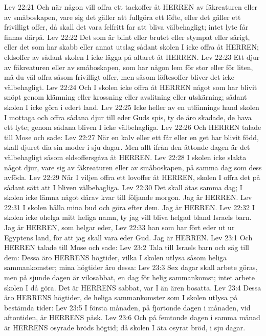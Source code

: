 Lev 22:21  Och när någon vill offra ett tackoffer åt HERREN av fäkreaturen eller av småboskapen, vare sig det gäller att fullgöra ett löfte, eller det gäller ett frivilligt offer, då skall det vara felfritt far att bliva välbehagligt; intet lyte får finnas därpå.
Lev 22:22  Det som är blint eller brutet eller stympat eller sårigt, eller det som har skabb eller annat utslag sådant skolen I icke offra åt HERREN; eldsoffer av sådant skolen I icke lägga på altaret åt HERREN.
Lev 22:23  Ett djur av fäkreaturen eller av småboskapen, som har någon lem för stor eller för liten, må du väl offra såsom frivilligt offer, men såsom löftesoffer bliver det icke välbehagligt.
Lev 22:24  Och I skolen icke offra åt HERREN något som har blivit snöpt genom klämning eller krossning eller avslitning eller utskärning; sådant skolen I icke göra i edert land.
Lev 22:25  Icke heller av en utlännings hand skolen I mottaga och offra sådana djur till eder Guds spis, ty de äro skadade, de hava ett lyte; genom sådana bliven I icke välbehagliga.
Lev 22:26  Och HERREN talade till Mose och sade:
Lev 22:27  När en kalv eller ett får eller en get har blivit född, skall djuret dia sin moder i sju dagar. Men allt ifrån den åttonde dagen är det välbehagligt såsom eldsoffersgåva åt HERREN.
Lev 22:28  I skolen icke slakta något djur, vare sig av fäkreaturen eller av småboskapen, på samma dag som dess avföda.
Lev 22:29  När I viljen offra ett lovoffer åt HERREN, skolen I offra det på sådant sätt att I bliven välbehagliga.
Lev 22:30  Det skall ätas samma dag; I skolen icke lämna något därav kvar till följande morgon. Jag är HERREN.
Lev 22:31  I skolen hålla mina bud och göra efter dem. Jag är HERREN.
Lev 22:32  I skolen icke ohelga mitt heliga namn, ty jag vill bliva helgad bland Israels barn. Jag är HERREN, som helgar eder,
Lev 22:33  han som har fört eder ut ur Egyptens land, för att jag skall vara eder Gud. Jag är HERREN.
Lev 23:1  Och HERREN talade till Mose och sade:
Lev 23:2  Tala till Israels barn och säg till dem: Dessa äro HERRENS högtider, vilka I skolen utlysa såsom heliga sammankomster; mina högtider äro dessa:
Lev 23:3  Sex dagar skall arbete göras, men på sjunde dagen är vilosabbat, en dag för helig sammankomst; intet arbete skolen I då göra. Det är HERRENS sabbat, var I än ären bosatta.
Lev 23:4  Dessa äro HERRENS högtider, de heliga sammankomster som I skolen utlysa på bestämda tider:
Lev 23:5  I första månaden, på fjortonde dagen i månaden, vid aftontiden, är HERRENS påsk.
Lev 23:6  Och på femtonde dagen i samma månad är HERRENS osyrade bröds högtid; då skolen I äta osyrat bröd, i sju dagar.
